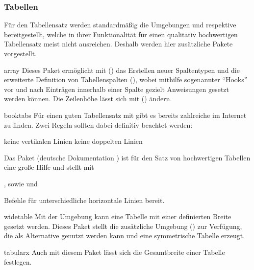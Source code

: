 %



\subsubsection{%
  Tabellen%
}
%
Für den Tabellensatz werden standardmäßig die Umgebungen  
und  respektive  bereitgestellt, 
welche in ihrer Funktionalität für einen qualitativ hochwertigen Tabellensatz 
meist nicht ausreichen. Deshalb werden hier zusätzliche Pakete vorgestellt. 
%
\begin{packages}
\item[array]
  Dieses Paket ermöglicht mit () das   
  Erstellen neuer Spaltentypen und die erweiterte Definition von Tabellenspalten
  (\PValue{>\MPValue{\dots}}\PValue{<\MPValue{\dots}}),   
  wobei mithilfe sogenannter \enquote{Hooks} vor und nach Einträgen innerhalb 
  einer Spalte gezielt Anweisungen gesetzt werden können. Die Zeilenhöhe lässt 
  sich mit () ändern. 
\item[booktabs]
  Für einen guten Tabellensatz mit  gibt es bereits zahlreiche 
   im 
  Internet zu finden. Zwei Regeln sollten dabei definitiv beachtet werden:
  \begin{enumerate}[itemindent=0pt,labelwidth=*,labelsep=1em,label=\Roman*.]
  \stditem keine vertikalen Linien
  \stditem keine doppelten Linien
  \end{enumerate}
  Das Paket  (deutsche Dokumentation ) 
  ist für den Satz von hochwertigen Tabellen eine große Hilfe und stellt mit  
  \begin{Entity}{}
  ,  sowie  und 
  \end{Entity}
  Befehle für unterschiedliche horizontale Linien bereit.
\item[widetable]
  Mit der Umgebung  kann eine Tabelle mit einer 
  definierten Breite gesetzt werden. Dieses Paket stellt die zusätzliche 
  Umgebung () zur Verfügung, die als 
  Alternative genutzt werden kann und eine symmetrische Tabelle erzeugt.
\item[tabularx]
  Auch mit diesem Paket lässt sich die Gesamtbreite einer Tabelle festlegen.

\end{packages}
